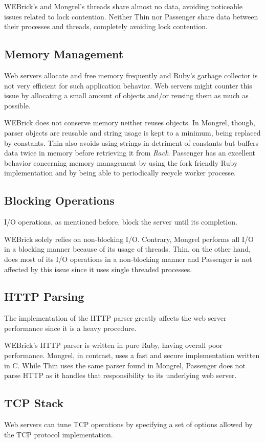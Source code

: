 WEBrick's and Mongrel's threads share almost no data, avoiding noticeable issues related to lock contention. Neither Thin nor Passenger share data between their processes and threads, completely avoiding lock contention.

\subsection{Memory Management}
Web servers allocate and free memory frequently and Ruby's garbage collector is not very efficient for such application behavior. Web servers might counter this issue by allocating a small amount of objects and/or reusing them as much as possible.

WEBrick does not conserve memory neither reuses objects. In Mongrel, though, parser objects are reusable and string usage is kept to a minimum, being replaced by constants. Thin also avoids using strings in detriment of constants but buffers data twice in memory before retrieving it from \textit{Rack}. Passenger has an excellent behavior concerning memory management by using the fork friendly Ruby implementation and by being able to periodically recycle worker processe.

\subsection{Blocking Operations}
I/O operations, as mentioned before, block the server until its completion.

WEBrick solely relies on non-blocking I/O. Contrary, Mongrel performs all I/O in a blocking manner because of its usage of threads. Thin, on the other hand, does most of its I/O operations in a non-blocking manner and Passenger is not affected by this issue since it uses single threaded processes.

\subsection{HTTP Parsing}
The implementation of the HTTP parser greatly affects the web server performance since it is a heavy procedure.

WEBrick's HTTP parser is written in pure Ruby, having overall poor performance. Mongrel, in contrast, uses a fast and secure implementation written in C. While Thin uses the same parser found in Mongrel, Passenger does not parse HTTP as it handles that responsibility to its underlying web server.

\subsection{TCP Stack}
Web servers can tune TCP operations by specifying a set of options allowed by the TCP protocol implementation.

